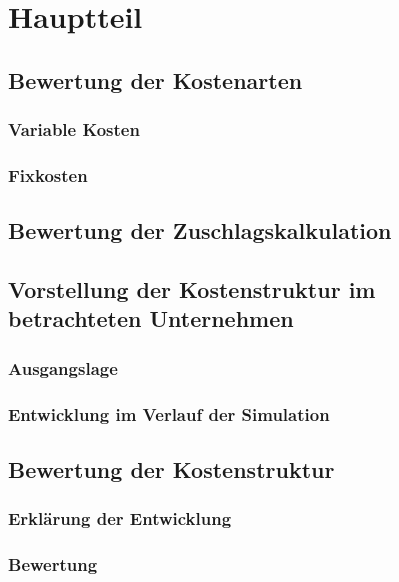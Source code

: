 \section{Hauptteil}
\label{sec:hauptteil}

\subsection{Bewertung der Kostenarten}

\subsubsection{Variable Kosten}
\subsubsection{Fixkosten}

\subsection{Bewertung der Zuschlagskalkulation}

\subsection{Vorstellung der Kostenstruktur im betrachteten Unternehmen}
\subsubsection{Ausgangslage}
\subsubsection{Entwicklung im Verlauf der Simulation}

\subsection{Bewertung der Kostenstruktur}
\subsubsection{Erklärung der Entwicklung}
\subsubsection{Bewertung}
